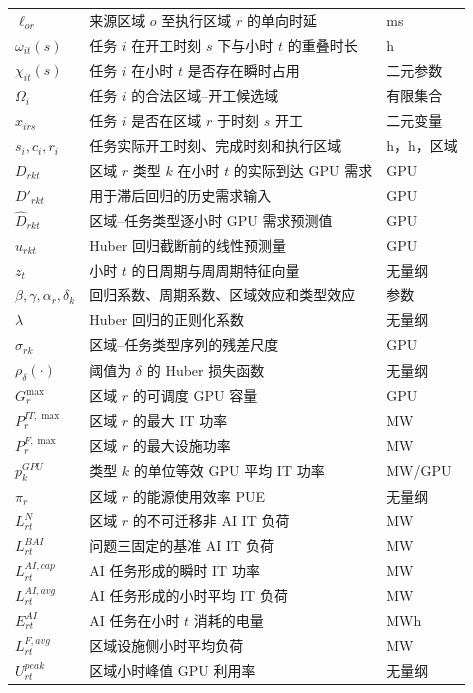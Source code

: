 \documentclass[withoutpreface,bwprint]{cumcmthesis}
\begin{document}
{\begin{longtable}{lll}
$\ell_{or}$ & 来源区域 $o$ 至执行区域 $r$ 的单向时延 & ms \\
$\omega_{it}(s)$ & 任务 $i$ 在开工时刻 $s$ 下与小时 $t$ 的重叠时长 & h \\
$\chi_{it}(s)$ & 任务 $i$ 在小时 $t$ 是否存在瞬时占用 & 二元参数 \\
$\Omega_i$ & 任务 $i$ 的合法区域--开工候选域 & 有限集合 \\
$x_{irs}$ & 任务 $i$ 是否在区域 $r$ 于时刻 $s$ 开工 & 二元变量 \\
$s_i,c_i,r_i$ & 任务实际开工时刻、完成时刻和执行区域 & h，h，区域 \\
$D_{rkt}$ & 区域 $r$ 类型 $k$ 在小时 $t$ 的实际到达 GPU 需求 & GPU \\
$D'_{rkt}$ & 用于滞后回归的历史需求输入 & GPU \\
$\widehat D_{rkt}$ & 区域--任务类型逐小时 GPU 需求预测值 & GPU \\
$u_{rkt}$ & Huber 回归截断前的线性预测量 & GPU \\
$z_t$ & 小时 $t$ 的日周期与周周期特征向量 & 无量纲 \\
$\beta,\gamma,\alpha_r,\delta_k$ & 回归系数、周期系数、区域效应和类型效应 & 参数 \\
$\lambda$ & Huber 回归的正则化系数 & 无量纲 \\
$\sigma_{rk}$ & 区域--任务类型序列的残差尺度 & GPU \\
$\rho_{\delta}(\cdot)$ & 阈值为 $\delta$ 的 Huber 损失函数 & 无量纲 \\
$G_r^{\max}$ & 区域 $r$ 的可调度 GPU 容量 & GPU \\
$P_r^{IT,\max}$ & 区域 $r$ 的最大 IT 功率 & MW \\
$P_r^{F,\max}$ & 区域 $r$ 的最大设施功率 & MW \\
$p_k^{GPU}$ & 类型 $k$ 的单位等效 GPU 平均 IT 功率 & MW/GPU \\
$\pi_r$ & 区域 $r$ 的能源使用效率 PUE & 无量纲 \\
$L_{rt}^{N}$ & 区域 $r$ 的不可迁移非 AI IT 负荷 & MW \\
$L_{rt}^{BAI}$ & 问题三固定的基准 AI IT 负荷 & MW \\
$L_{rt}^{AI,cap}$ & AI 任务形成的瞬时 IT 功率 & MW \\
$L_{rt}^{AI,avg}$ & AI 任务形成的小时平均 IT 负荷 & MW \\
$E_{rt}^{AI}$ & AI 任务在小时 $t$ 消耗的电量 & MWh \\
$L_{rt}^{F,avg}$ & 区域设施侧小时平均负荷 & MW \\
$U_{rt}^{peak}$ & 区域小时峰值 GPU 利用率 & 无量纲 \\

\end{longtable}}
\end{document}
